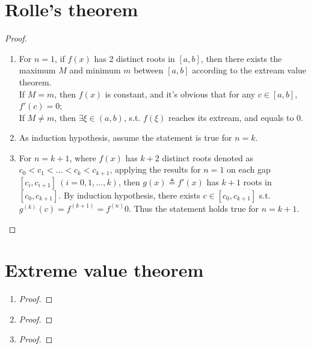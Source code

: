 \documentclass[paper=a4, fontsize=11pt]{scrartcl} %
\numberwithin{equation}{section} %
\numberwithin{figure}{section} %
\numberwithin{table}{section} %
\begin{document}
\section{Rolle's theorem}
	\begin{proof}
		\begin{enumerate}
			\item 
				For $n=1$, if $f(x)$ has 2 distinct roots in $[a, b]$, then there exists the maximum $M$ and minimum $m$ between $[a, b]$ according to the extream value theorem.\\
				If $M = m$, then $f(x)$ is constant, and it's obvious that for any $c \in [a, b]$, $f\prime(c) = 0$; \\
				If $M \neq m$, then $\exists \xi \in (a, b)$, s.t.  $f(\xi)$ reaches its extream, and equals to 0.
			\item
				As induction hypothesis, assume the statement is true for $n = k$.
			\item 
				For $n = k+1$, where $f(x)$ has $k+2$ distinct roots denoted as $c_0 < c_1 < ... <c_k < c_{k+1}$, applying the results for $n = 1$ on each gap $[c_i, c_{i+1}]\ (i = 0, 1, ... , k)$, then $g(x) \triangleq f'(x)$ has $k+1$ roots in $[c_0, c_{k+1}]$. By induction hypothesis, there exists $c \in [c_0, c_{k+1}]$ s.t. $g^{(k)}(c) = f^{(k+1)} = f^{(n)} 0$. Thus the statement holds true for $n = k+1$.
		\end{enumerate}
	\end{proof}



\section{Extreme value theorem}

\begin{enumerate}
	\item
		\begin{proof}

		\end{proof}

	\item
		\begin{proof}
		
		\end{proof}
	
	\item
		\begin{proof}
			
		\end{proof}
\end{enumerate}
\end{document}
